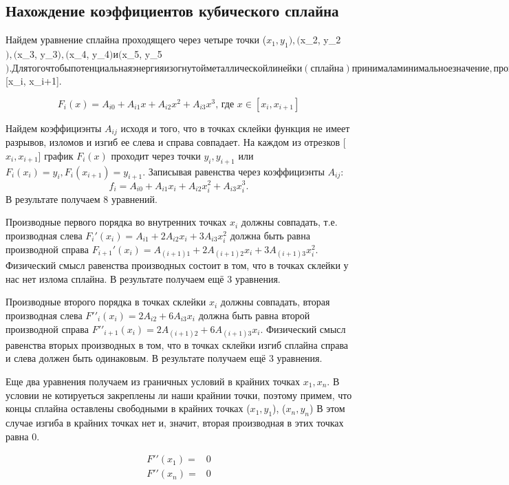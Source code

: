 \documentclass[russian,utf8,nocolumnxxxi,nocolumnxxxii]{eskdtext}
\begin{document}
\subsection{Нахождение коэффициентов кубического сплайна}

Найдем уравнение сплайна проходящего через четыре точки
($x_1, y_1), ($x_2, y_2$), ($x_3, y_3$), ($x_4, y_4$) и ($x_5, y_5$). Для того чтобы потенциальная энергия изогнутой металлической линейки (сплайна) принимала минимальное значение, производная четвертого порядка должна быть равна нулю, значит мы можем представить сплайн полиномом третьей степени на каждом отрезк $[x_i, x_{i+1}].

$$
F_i(x)=A_{i0}+A_{i1}x+A_{i2}x^2+A_{i3}x^3 \text{, где } x \in [x_i, x_{i+1}]
$$

Найдем коэффициэнты $A_{ij}$ исходя и того, что в точках склейки функция не имеет разрывов, изломов и изгиб ее слева и справа совпадает. На каждом из отрезков [$x_i, x_{i+1}$] график $F_i(x)$ проходит через точки $y_i, y_{i+1}$ или $F_i(x_i)=y_i, F_i(x_{i+1})=y_{i+1}$. Записывая равенства через коэффициэнты $A_{ij}$:
\[
f_i=A_{i0}+A_{i1}x_i+A_{i2}x^2_i+A_{i3}x^3_i.
\]
В результате  получаем 8 уравнений. 

Производные первого порядка во внутренних точках $x_i$ должны совпадать, т.е. производная слева $F_i'(x_i) =A_{i1}+2A_{i2}x_i+3A_{i3}x^2_i$ должна быть равна производной справа $F_{i+1}'(x_i)  =A_{(i+1)1}+ 2A_{(i+1)2}x_i+ 3A_{(i+1)3}x^2_i$. Физический смысл равенства производных состоит в том, что в точках склейки у нас нет излома сплайна.
В результате  получаем ещё 3 уравнения.

Производные второго порядка в точках склейки $x_i$ должны совпадать, вторая производная слева $F′′_i(x_i)  =  2A_{i2}+6A_{i3}x_i $ должна быть равна второй производной справа $F′′_{i+1}(x_i) = 2A_{(i+1)2}+ 6A_{(i+1)3}x_i$. Физический смысл равенства вторых производных в том, что в точках склейки изгиб сплайна справа и слева должен быть одинаковым. 
В результате  получаем ещё 3 уравнения.

Еще два уравнения получаем из граничных условий в крайних точках $x_1, x_n$. В условии не котируеться закреплены ли наши крайнии точки, поэтому примем, что концы сплайна оставлены свободными в крайних точках ($x_1, y_1$), ($x_n, y_n$) В этом случае изгиба в крайних точках нет и, значит, вторая производная в этих точках равна 0.

\[\begin{align*}
F′′(x_1)=&0\\
F′′(x_n)=&0
\end{align*}
\]
\end{document}
